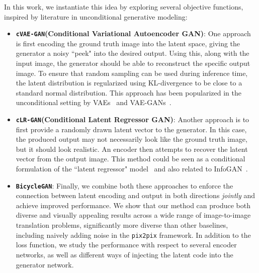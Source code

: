 \documentclass{article}
\newcommand{\pp}{\texttt{pix2pix}\xspace}
\newcommand{\cinfogan}{\texttt{cLR-GAN}\xspace}
\newcommand{\cvaegan}{\texttt{cVAE-GAN}\xspace}
\newcommand{\bicycle}{\texttt{BicycleGAN}\xspace} \newcommand{\G}{G\xspace}
\begin{document}
In this work, we instantiate this idea by exploring several objective functions, inspired by literature in unconditional generative modeling:
  \begin{itemize}[leftmargin=0.1in]
  
    \item \textbf{\cvaegan (Conditional Variational Autoencoder GAN)}:
    One approach is first encoding the ground truth image into the latent space, giving the generator a noisy ``peek" into the desired output. Using this, along with the input image, the generator should be able to reconstruct the specific output image. To ensure that random sampling can be used during inference time, the latent distribution is regularized using KL-divergence to be close to a standard normal distribution. This approach has been popularized in the unconditional setting by VAEs~\citep{kingma2013auto} and VAE-GANs~\citep{larsen2016vaegan}.
    
    \item \textbf{\cinfogan (Conditional Latent Regressor GAN)}: Another approach is to first provide a randomly drawn latent vector to the generator. In this case, the produced output may not necessarily look like the ground truth image, but it should look realistic. An encoder then attempts to recover the latent vector from the output image. This method could be seen as a conditional formulation of the ``latent regressor" model~\citep{donahue2016adversarial,dumoulin2016adversarially} and also related to InfoGAN~\citep{xi2016infogan}.
    
    \item \textbf{\bicycle}: Finally, we combine both these approaches to enforce the connection between latent encoding and output in both directions {\em jointly} and achieve improved performance. We show that our method can produce both diverse and visually appealing results across a wide range of image-to-image translation problems, significantly more diverse than other baselines, including naively adding noise in the \pp framework. In addition to the loss function, we study the performance with respect to several encoder networks, as well as different ways of injecting the latent code into the generator network. 
\end{itemize}
\end{document}
